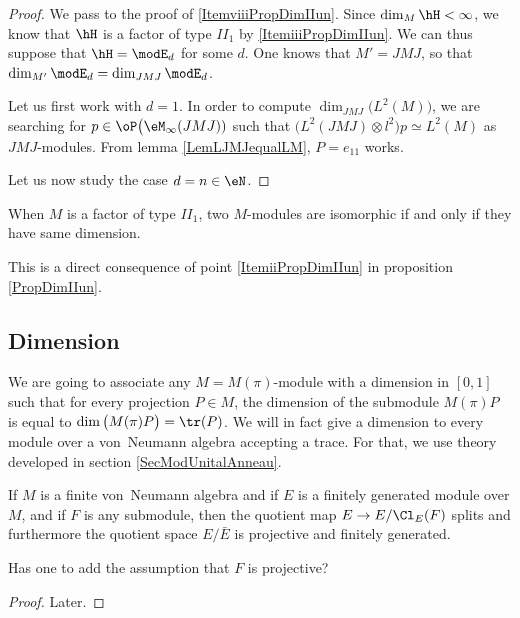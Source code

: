 \begin{proof}
	We pass to the proof of \ref{ItemviiiPropDimIIun}. Since $\dim_M\hH<\infty$, we know that $\hH$ is a factor of type $II_1$ by \ref{ItemiiiPropDimIIun}. We can thus suppose that $\hH=\modE_d$ for some $d$. One knows that $M'=JMJ$, so that $\dim_{M'}\modE_d=\dim_{JMJ}\modE_d$. 
	
	Let us first work with $d=1$. In order to compute $\dim_{JMJ}\big( L^2(M) \big)$, we are searching for $p\in\oP\big(\eM_{\infty}(JMJ))$ such that $\big( L^2(JMJ)\otimes l^2 \big)p\simeq L^2(M)$ as $JMJ$-modules. From lemma \ref{LemLJMJequalLM}, $P=e_{11}$ works.
	
	Let us now study the case $d=n\in\eN$.
	
\end{proof}

\begin{corollary}
	When $M$ is a factor of type $II_1$, two $M$-modules are isomorphic if and only if they have same dimension.
\end{corollary}
This is a direct consequence of point \ref{ItemiiPropDimIIun} in proposition \ref{PropDimIIun}.


					\subsection{Dimension}

We are going to associate any $M=M(\pi)$-module with a dimension in $[0,1]$ such that for every projection $P\in M$, the dimension of the submodule $M(\pi)P$ is equal to $\dim\big( M(\pi)P \big)=\tr(P)$. We will in fact give a dimension to every module over a von~Neumann algebra accepting a trace. For that, we use theory developed in section \ref{SecModUnitalAnneau}.

\begin{theorem}			\label{ThofgsurMFSubEEClSplits}
If $M$ is a finite von~Neumann algebra and if $E$ is a finitely generated module over $M$, and if $F$ is any submodule, then the quotient map $E\to E/\Cl_E(F)$ splits and furthermore the quotient space $E/\bar E$ is projective and finitely generated.
\end{theorem}

\begin{probleme}
Has one to add the assumption that $F$ is projective?
\end{probleme}
\begin{proof}
Later.
\end{proof}

